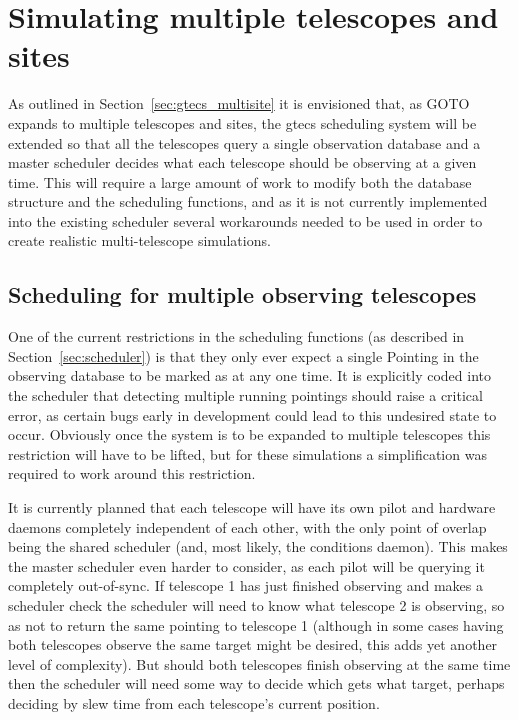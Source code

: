 \section{Simulating multiple telescopes and sites}
\label{sec:multi_site}
\begin{colsection}


\begin{colsection}

As outlined in Section~\ref{sec:gtecs_multisite} it is envisioned that, as GOTO expands to multiple telescopes and sites, the \gls{gtecs} scheduling system will be extended so that all the telescopes query a single observation database and a master scheduler decides what each telescope should be observing at a given time. This will require a large amount of work to modify both the database structure and the scheduling functions, and as it is not currently implemented into the existing scheduler several workarounds needed to be used in order to create realistic multi-telescope simulations.

\end{colsection}


\subsection{Scheduling for multiple observing telescopes}
\label{sec:multi_tel_scheduling}
\begin{colsection}

One of the current restrictions in the scheduling functions (as described in Section~\ref{sec:scheduler}) is that they only ever expect a single Pointing in the observing database to be marked as  at any one time. It is explicitly coded into the scheduler that detecting multiple running pointings should raise a critical error, as certain bugs early in development could lead to this undesired state to occur. Obviously once the system is to be expanded to multiple telescopes this restriction will have to be lifted, but for these simulations a simplification was required to work around this restriction.

It is currently planned that each telescope will have its own pilot and hardware daemons completely independent of each other, with the only point of overlap being the shared scheduler (and, most likely, the conditions daemon). This makes the master scheduler even harder to consider, as each pilot will be querying it completely out-of-sync. If telescope 1 has just finished observing and makes a scheduler check the scheduler will need to know what telescope 2 is observing, so as not to return the same pointing to telescope 1 (although in some cases having both telescopes observe the same target might be desired, this adds yet another level of complexity). But should both telescopes finish observing at the same time then the scheduler will need some way to decide which gets what target, perhaps deciding by slew time from each telescope's current position.


\end{colsection}
\end{colsection}
